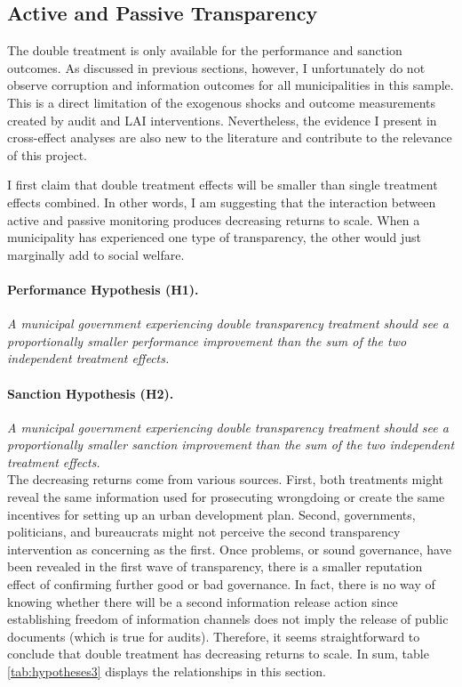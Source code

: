 \documentclass[11pt]{article}
\begin{document}
\subsection{Active and Passive Transparency} \label{subsec:theory3_paper3}

The double treatment is only available for the performance and sanction outcomes. As discussed in previous sections, however, I unfortunately do not observe corruption and information outcomes for all municipalities in this sample. This is a direct limitation of the exogenous shocks and outcome measurements created by audit and LAI interventions. Nevertheless, the evidence I present in cross-effect analyses are also new to the literature and contribute to the relevance of this project.

I first claim that double treatment effects will be smaller than single treatment effects combined. In other words, I am suggesting that the interaction between active and passive monitoring produces decreasing returns to scale. When a municipality has experienced one type of transparency, the other would just marginally add to social welfare.

\paragraph{Performance Hypothesis (H1).} \emph{A municipal government experiencing double transparency treatment should see a proportionally smaller performance improvement than the sum of the two independent treatment effects.}

\paragraph{Sanction Hypothesis (H2).} \emph{A municipal government experiencing double transparency treatment should see a proportionally smaller sanction improvement than the sum of the two independent treatment effects.} \\

The decreasing returns come from various sources. First, both treatments might reveal the same information used for prosecuting wrongdoing or create the same incentives for setting up an urban development plan. Second, governments, politicians, and bureaucrats might not perceive the second transparency intervention as concerning as the first. Once problems, or sound governance, have been revealed in the first wave of transparency, there is a smaller reputation effect of confirming further good or bad governance. In fact, there is no way of knowing whether there will be a second information release action since establishing freedom of information channels does not imply the release of public documents (which is true for audits). Therefore, it seems straightforward to conclude that double treatment has decreasing returns to scale. In sum, table \ref{tab:hypotheses3} displays the relationships in this section.
\end{document}
